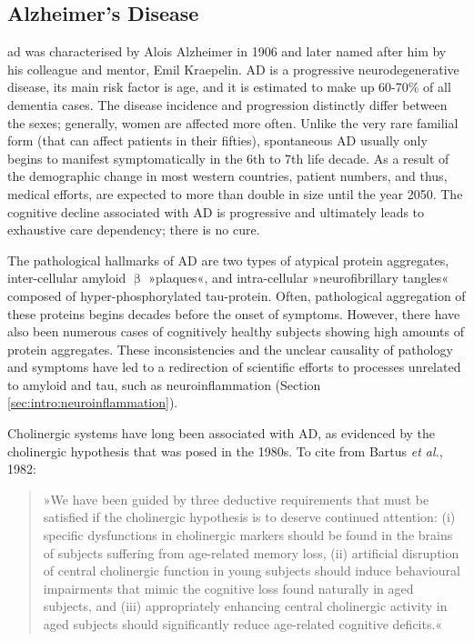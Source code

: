 \subsection{Alzheimer's Disease}
\ac{ad} was characterised by Alois Alzheimer in 1906 and later named after him by his colleague and mentor, Emil Kraepelin.\cite{Berrios1990} AD is a progressive neurodegenerative disease, its main risk factor is age, and it is estimated to make up 60-70\% of all dementia cases. The disease incidence and progression distinctly differ between the sexes;\cite{Miech2002} generally, women are affected more often. Unlike the very rare familial form (that can affect patients in their fifties), spontaneous AD usually only begins to manifest symptomatically in the 6th to 7th life decade. As a result of the demographic change in most western countries, patient numbers, and thus, medical efforts, are expected to more than double in size until the year 2050. The cognitive decline associated with AD is progressive and ultimately leads to exhaustive care dependency; there is no cure.

The pathological hallmarks of AD are two types of atypical protein aggregates, inter-cellular amyloid $\upbeta$ »plaques«, and intra-cellular »neurofibrillary tangles« composed of hyper-phosphorylated tau-protein. Often, pathological aggregation of these proteins begins decades before the onset of symptoms. However, there have also been numerous cases of cognitively healthy subjects showing high amounts of protein aggregates. These inconsistencies and the unclear causality of pathology and symptoms have led to a redirection of scientific efforts to processes unrelated to amyloid and tau, such as neuroinflammation (Section \ref{sec:intro:neuroinflammation}).

Cholinergic systems have long been associated with AD, as evidenced by the cholinergic hypothesis that was posed in the 1980s. To cite from Bartus \emph{et al.}, 1982:\cite{Bartus1982}

\begin{quote}
»We have been guided by three deductive requirements that must be satisfied if the cholinergic hypothesis is to deserve continued attention: (i) specific dysfunctions in cholinergic markers should be found in the brains of subjects suffering from age-related memory loss, (ii) artificial disruption of central cholinergic function in young subjects should induce behavioural impairments that mimic the cognitive loss found naturally in aged subjects, and (iii) appropriately enhancing central cholinergic activity in aged subjects should significantly reduce age-related cognitive deficits.«
\end{quote}

